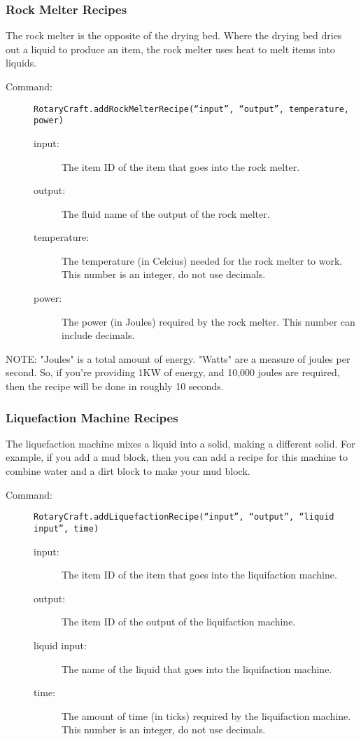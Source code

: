\documentclass[letterpaper,titlepage,12pt]{article}
\begin{document}
\subsubsection{Rock Melter Recipes}

The rock melter is the opposite of the drying bed.  Where the drying bed dries out a liquid to produce an item, the rock melter uses heat to melt items into liquids.

\begin{description}
\item[Command:] \texttt{RotaryCraft.addRockMelterRecipe(``input'', ``output'', temperature, power)}
\begin{description}
\item [input:] The item ID of the item that goes into the rock melter.
\item [output:] The fluid name of the output of the rock melter.
\item [temperature:] The temperature (in Celcius) needed for the rock melter to work.  This number is an integer, do not use decimals.
\item [power:] The power (in Joules) required by the rock melter.  This number can include decimals.
\end{description}
\end{description}

NOTE: "Joules" is a total amount of energy.  "Watts" are a measure of joules per second.  So, if you're providing 1KW of energy, and 10,000 joules are required, then the recipe will be done in roughly 10 seconds.

\subsubsection{Liquefaction Machine Recipes}

The liquefaction machine mixes a liquid into a solid, making a different solid.  For example, if you add a mud block, then you can add a recipe for this machine to combine water and a dirt block to make your mud block.

\begin{description}
\item[Command:] \texttt{RotaryCraft.addLiquefactionRecipe(``input'', ``output'', ``liquid input'', time)}
\begin{description}
\item [input:] The item ID of the item that goes into the liquifaction machine.
\item [output:] The item ID of the output of the liquifaction machine.
\item [liquid input:] The name of the liquid that goes into the liquifaction machine.
\item [time:] The amount of time (in ticks) required by the liquifaction machine.  This number is an integer, do not use decimals.
\end{description}
\end{description}
\end{document}
